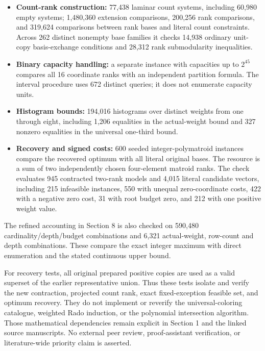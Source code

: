 \begin{itemize}
\tightlist
\item
  \textbf{Count-rank construction:} 77,438 laminar count systems, including 60,980 empty systems; 1,480,360 extension comparisons, 200,256 rank comparisons, and 319,624 comparisons between rank bases and literal count constraints. Across 262 distinct nonempty base families it checks 14,938 ordinary unit-copy basis-exchange conditions and 28,312 rank submodularity inequalities.
\item
  \textbf{Binary capacity handling:} a separate instance with capacities up to \(2^{45}\) compares all 16 coordinate ranks with an independent partition formula. The interval procedure uses 672 distinct queries; it does not enumerate capacity units.
\item
  \textbf{Histogram bounds:} 194,016 histograms over distinct weights from one through eight, including 1,206 equalities in the actual-weight bound and 327 nonzero equalities in the universal one-third bound.
\item
  \textbf{Recovery and signed costs:} 600 seeded integer-polymatroid instances compare the recovered optimum with all literal original bases. The resource is a sum of two independently chosen four-element matroid ranks. The check evaluates 945 contracted two-rank models and 4,015 literal candidate vectors, including 215 infeasible instances, 550 with unequal zero-coordinate costs, 422 with a negative zero cost, 31 with root budget zero, and 212 with one positive weight value.
\end{itemize}

The refined accounting in Section 8 is also checked on 590,480 cardinality/depth/budget combinations and 6,321 actual-weight, row-count and depth combinations. These compare the exact integer maximum with direct enumeration and the stated continuous upper bound.

For recovery tests, all original prepared positive copies are used as a valid superset of the earlier representative union. Thus these tests isolate and verify the new contraction, projected count rank, exact fixed-exception feasible set, and optimum recovery. They do not implement or reverify the universal-coloring catalogue, weighted Rado induction, or the polynomial intersection algorithm. Those mathematical dependencies remain explicit in Section 1 and the linked source manuscripts. No external peer review, proof-assistant verification, or literature-wide priority claim is asserted.

